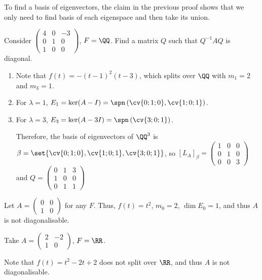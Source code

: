 \documentclass[11pt]{scrartcl}
\begin{document}
To find a basis of eigenvectors, the claim in the previous proof shows
that we only need to find basis of each eigenspace and then take its union.

\begin{problem*}
  Consider $\begin{pmatrix}
    4 & 0 & -3\\
    0 & 1 & 0\\
    1 & 0 & 0
  \end{pmatrix}$, $F = \QQ$. Find a matrix $Q$ such that $Q^{-1}AQ$ is diagonal.
\end{problem*}
\begin{soln}
\begin{enumerate}

\item Note that $f(t) = -(t-1)^2(t-3)$, which splits over
  $\QQ$ with $m_{1} = 2$ and $m_3 = 1$.
\item For $\lambda=1$, $E_1 = \ker(A-I) = \spn \left( \cv{0;1;0}, \cv{1;0;1} \right)$.
\item For $\lambda=3$, $E_{3} = \ker(A-3I) = \spn \left( \cv{3; 0; 1} \right)$.

  Therefore, the basis of eigenvectors of $\QQ^{3}$ is
  $\beta = \set{\cv{0;1;0}, \cv{1;0;1}, \cv{3; 0; 1}}$, so $[L_{A}]_{\beta} = \begin{pmatrix}
1 & 0 & 0\\
0 & 1 & 0\\
0 & 0 & 3
  \end{pmatrix}$ and $Q = \begin{pmatrix}
0 & 1 & 3\\
1 & 0 & 0\\
0 & 1 & 1
  \end{pmatrix}$
\end{enumerate}
\end{soln}

\begin{example}

Let $A = \begin{pmatrix}
0 & 0\\
1 & 0
\end{pmatrix}$ for any $F$. Thus, $f(t) = t^{2}$, $m_{0} =2$,
$\dim E_0 = 1$, and thus $A$ is not diagonalisable.
\end{example}

\begin{example}

Take $A = \begin{pmatrix}
2 & -2\\
1 & 0
\end{pmatrix}$, $F = \RR$.

Note that $f(t) = t^2 - 2t + 2$ does not split over $\RR$, and thus
$A$ is not diagonalisable.

\end{example}
\end{document}
